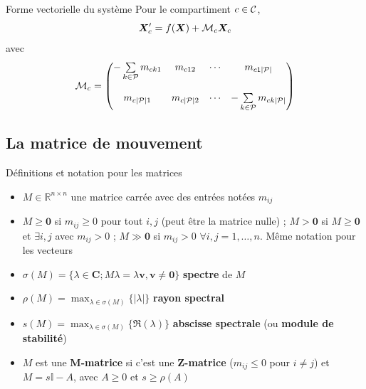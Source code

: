 \documentclass[aspectratio=169]{beamer}\usepackage[]{graphicx}\usepackage[]{xcolor}
\begin{document}
\begin{frame}{Forme vectorielle du système}
Pour le compartiment $c\in\C$,
\begin{equation}\label{eq:general_metapop}
\bX_c'=f(\bX)+\mathcal{M}_c\bX_c
\end{equation}
avec
\begin{equation}\label{eq:movement_matrix}
\mathcal{M}_c =
\begin{pmatrix}
-\sum\limits_{k\in\P}m_{ck1} & m_{c12} & \cdots & m_{c1|\P|} \\
& & & \\
m_{c|\P|1} & m_{c|\P|2} & \cdots & -\sum\limits_{k\in\P}m_{ck|\P|}
\end{pmatrix}
\end{equation}
\end{frame}


\subsection{La matrice de mouvement}

\begin{frame}{Définitions et notation pour les matrices}
\begin{itemize}
	\item $M\in\mathbb{R}^{n\times n}$ une matrice carrée avec des entrées notées $m_{ij}$
	\vfill
	\item $M\geq\mathbf{0}$ si $m_{ij}\geq 0$ pour tout $i,j$ (peut être la matrice nulle) ; $M>\mathbf{0}$ si $M\geq\mathbf{0}$ et $\exists i,j$ avec $m_{ij}>0$ ; $M\gg\mathbf{0}$ si $m_{ij}>0$ $\forall i,j=1,\ldots,n$. Même notation pour les vecteurs
	\vfill
	\item $\sigma(M)=\{\lambda\in\mathbf{C}; M\lambda=\lambda\mathbf{v}, \mathbf{v}\neq\mathbf{0}\}$ \textbf{spectre} de $M$
	\vfill
	\item $\rho(M)=\max_{\lambda\in\sigma(M)}\{|\lambda|\}$ \textbf{rayon spectral}
	\vfill
	\item $s(M)=\max_{\lambda\in\sigma(M)}\{\Re(\lambda)\}$ \textbf{abscisse spectrale} (ou \textbf{module de stabilité})
	\vfill
	\item $M$ est une \textbf{M-matrice} si c'est une \textbf{Z-matrice} ($m_{ij}\leq 0$ pour $i\neq j$) et $M = s\mathbb{I}-A$, avec $A\geq 0$ et $s\geq \rho(A)$
\end{itemize}
\end{frame}
\end{document}
